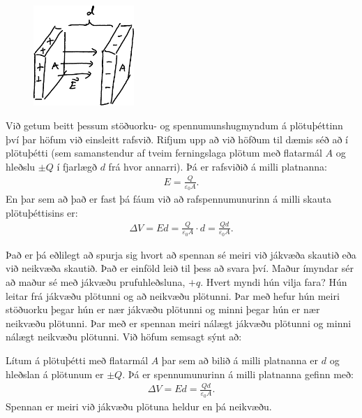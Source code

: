 \ifdefined \wholebook \else\documentclass[oneside]{book}\usepackage{EdlBook}\graphicspath{{figures/}}
\begin{document}
\begin{minipage}{\linewidth}
\begin{figure}
\vspace{-0.95cm}
\includegraphics[width=1.5in]{figures/eda.pdf}
\end{figure}

Við getum beitt þessum stöðuorku- og spennumunshugmyndum á plötuþéttinn því þar höfum við einsleitt rafsvið. Rifjum upp að við höfðum til dæmis séð að í plötuþétti (sem samanstendur af tveim ferningslaga plötum með flatarmál $A$ og hleðslu $\pm Q$ í fjarlægð $d$ frá hvor annarri). Þá er rafsviðið á milli platnanna:
\begin{align*}
    E = \frac{Q}{\varepsilon_0 A}.
\end{align*}
En þar sem að það er fast þá fáum við að rafspennumunurinn á milli skauta plötuþéttisins er:
\begin{align*}
    \Delta V = Ed = \frac{Q}{\varepsilon_0 A } \cdot d = \frac{Q d}{\varepsilon_0 A}.
\end{align*}

Það er þá eðlilegt að spurja sig hvort að spennan sé meiri við jákvæða skautið eða við neikvæða skautið. Það er einföld leið til þess að svara því. Maður ímyndar sér að maður sé með jákvæðu prufuhleðsluna, $+q$. Hvert myndi hún vilja fara? Hún leitar frá jákvæðu plötunni og að neikvæðu plötunni. Þar með hefur hún meiri stöðuorku þegar hún er nær jákvæðu plötunni og minni þegar hún er nær neikvæðu plötunni. Þar með er spennan meiri nálægt jákvæðu plötunni og minni nálægt neikvæðu plötunni. Við höfum semsagt sýnt að:
\end{minipage}
\begin{tcolorbox}
\begin{theorem}
Lítum á plötuþétti með flatarmál $A$ þar sem að bilið á milli platnanna er $d$ og hleðslan á plötunum er $\pm Q$. Þá er spennumunurinn á milli platnanna gefinn með:
\begin{align*}
    \Delta V = Ed = \frac{Qd}{\varepsilon_0 A}.
\end{align*}
Spennan er meiri við jákvæðu plötuna heldur en þá neikvæðu.
\end{theorem}
\end{tcolorbox}
\end{document}
